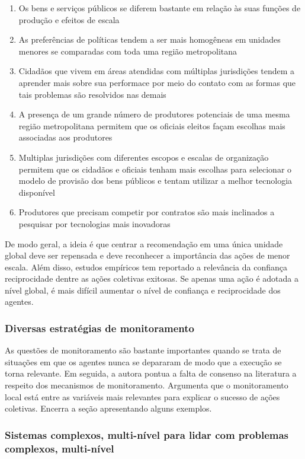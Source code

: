 \documentclass[11pt]{article}
\begin{document}
\begin{enumerate}
\item Os bens e serviços públicos se diferem bastante em relação às suas funções de produção e efeitos de escala
\item As preferências de políticas tendem a ser mais homogêneas em unidades menores se comparadas com toda uma região metropolitana
\item Cidadãos que vivem em áreas atendidas com múltiplas jurisdições tendem a aprender mais sobre sua performace por meio do contato com as formas que tais problemas são resolvidos nas demais
\item A presença de um grande número de produtores potenciais de uma mesma região metropolitana permitem que os oficiais eleitos façam escolhas mais associadas aos produtores
\item Multiplas jurisdições com diferentes escopos e escalas de organização permitem que os cidadãos e oficiais tenham mais escolhas para selecionar o modelo de provisão dos bens públicos e tentam utilizar a melhor tecnologia disponível
\item Produtores que precisam competir por contratos são mais inclinados a pesquisar por tecnologias mais inovadoras
\end{enumerate}

De modo geral, a ideia é que centrar a recomendação em uma única unidade global deve ser repensada e deve reconhecer a importância das ações de menor escala.
Além disso, estudos empíricos tem reportado a relevância da confiança reciprocidade dentre as ações coletivas exitosas.
Se apenas uma ação é adotada a nível global, é mais difícil aumentar o nível de confiança e reciprocidade dos agentes.

\subsubsection{Diversas estratégias de monitoramento}
\label{sec:orgd9c0e60}

As questões de monitoramento são bastante importantes quando se trata de situações em que os agentes nunca se depararam de modo que a execução se torna relevante.
Em seguida, a autora pontua a falta de consenso na literatura a respeito dos mecanismos de monitoramento.
Argumenta que o monitoramento local está entre as variáveis mais relevantes para explicar o sucesso de ações coletivas.
Encerra a seção apresentando alguns exemplos.

\subsubsection{Sistemas complexos, multi-nível para lidar com problemas complexos, multi-nível}
\label{sec:orgdfbb6b4}
\end{document}
